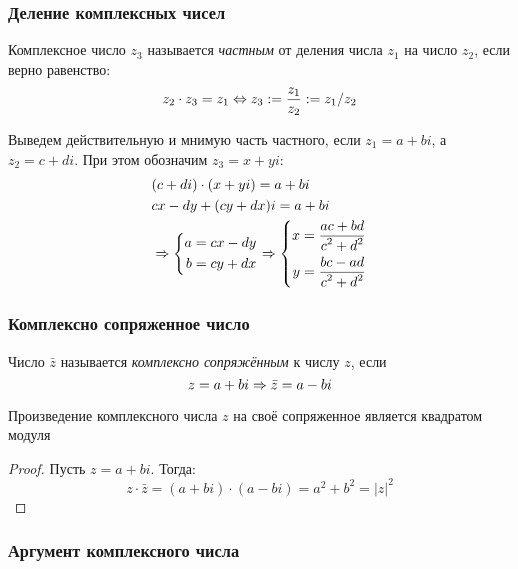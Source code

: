 \subsubsection{Деление комплексных чисел}

\begin{definition}
    Комплексное число $z_3$ называется \textit{частным} от деления числа $z_1$ на число $z_2$, если верно равенство:
    $$
        z_2 \cdot z_3 = z_1 \Leftrightarrow z_3 := \frac{z_1}{z_2} := z_1 / z_2
    $$
\end{definition}

\begin{corollary}
    Выведем действительную и мнимую часть частного, если $z_1 = a + bi$, а $z_2 = c + di$. При этом обозначим $z_3 = x + yi$:
    \begin{align*}
        &(c + di) \cdot (x + yi) = a + bi
        \\
        &cx - dy + (cy + dx)i = a + bi
        \\
        &\Rightarrow \left\{\begin{aligned}a = cx - dy \\ b = cy + dx\end{aligned}\right.
        \Rightarrow \left\{\begin{aligned}x = \frac{\displaystyle ac + bd}{\displaystyle c^2 + d^2} \\ y = \frac{\displaystyle bc - ad}{\displaystyle c^2 + d^2}\end{aligned}\right.
    \end{align*}
\end{corollary}

\subsubsection{Комплексно сопряженное число}

\begin{definition}
    Число $\bar{z}$ называется \textit{комплексно сопряжённым} к числу $z$, если
    $$
        z = a + bi \Rightarrow \bar{z} = a - bi
    $$
\end{definition}

\begin{proposition}
    Произведение комплексного числа $z$ на своё сопряженное является квадратом модуля
\end{proposition}

\begin{proof}
    Пусть $z = a + bi$. Тогда:
    $$
        z \cdot \bar{z} = (a + bi) \cdot (a - bi) = a^2 + b^2 = |z|^2
    $$
\end{proof}

\subsubsection{Аргумент комплексного числа}


